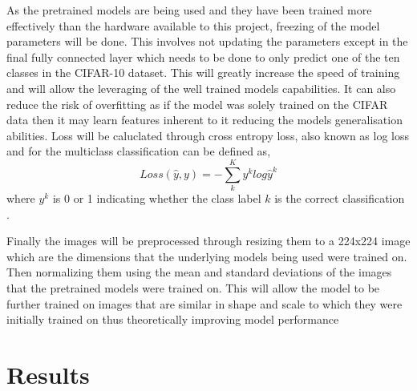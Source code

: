 \documentclass[10pt,twocolumn,letterpaper]{article}
\begin{document}
As the pretrained models are being used and they have been trained more effectively 
than the hardware available to this project, freezing of the model parameters will be done.
This involves not updating the parameters except in the final fully connected layer which 
needs to be done to only predict one of the ten classes in the CIFAR-10 dataset. This will 
greatly increase the speed of training and will allow the leveraging of the well trained 
models capabilities. It can also reduce the risk of overfitting as if the model was 
solely trained on the CIFAR data then it may learn features inherent to it reducing the models 
generalisation abilities. Loss will be caluclated through cross entropy loss, also known 
as log loss and for the multiclass classification can be defined as,
\begin{equation}
   Loss(\hat{y},y) = -\sum_{k}^{K}y^klog\hat{y}^k
\end{equation}
where $y^k$ is 0 or 1 indicating whether the class label $k$ is the correct classification \cite{Zafar_Tzanidou_Burton_Patel_Araujo}.

Finally the images will be preprocessed through resizing them to a 224x224 image which 
are the dimensions that the underlying models being used were trained on. Then
normalizing them using the mean and standard deviations of the images that the pretrained 
models were trained on. This will allow the model to be further trained on images that are similar 
in shape and scale to which they were initially trained on thus theoretically improving
model performance
\section {Results}
\end{document}
